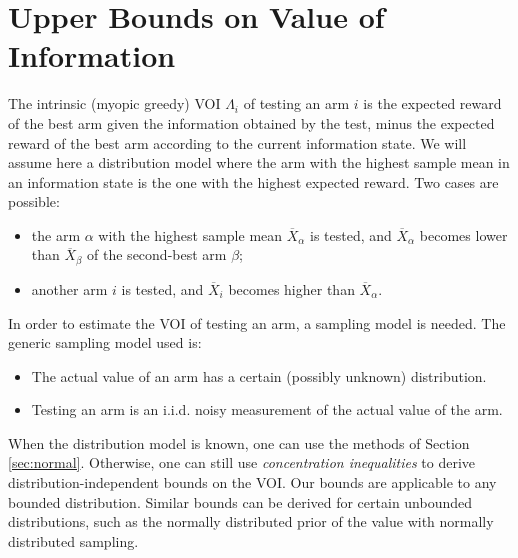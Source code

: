 \documentclass[]{article}
\begin{document}
\section{Upper Bounds on Value of Information}

The intrinsic (myopic greedy) VOI $\Lambda_i$ of testing an arm $i$ is
the expected reward of the best arm given the information obtained by the test,
minus the expected reward of the best arm according to the current information state.
We will assume here a distribution model where the arm with the highest sample mean
in an information state is the one with the highest expected reward.
Two cases are possible:
\begin{itemize}
\item the arm $\alpha$ with the highest sample mean $\overline
  X_\alpha$ is tested, and $\overline X_\alpha$ becomes lower than
  $\overline X_\beta$ of the second-best arm $\beta$;
\item another arm $i$ is tested, and $\overline X_i$ becomes higher
than $\overline X_\alpha$.
\end{itemize}

In order to estimate the VOI of testing an arm, a sampling model is
needed.  The generic sampling model used is: 
\begin{itemize}
\item The actual value of an arm has a certain (possibly unknown) distribution.
\item Testing an arm is an i.i.d. noisy measurement of the actual
  value of the arm.
\end{itemize}
When the distribution model is known, one can use the methods of Section \ref{sec:normal}.
Otherwise, one can still use {\em concentration
inequalities} to derive distribution-independent bounds on the
VOI. Our bounds are applicable to any bounded distribution. Similar
bounds can be derived for certain unbounded distributions, such as the
normally distributed prior of the value with normally distributed
sampling.
\end{document}
